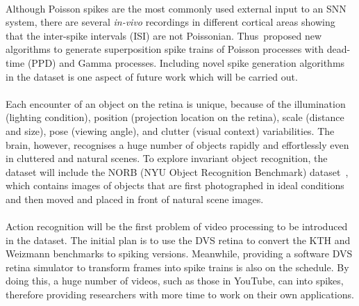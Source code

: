 \DIFdelbegin {}\DIFdelend \DIFaddbegin \paragraph{}
\DIFaddend Although Poisson spikes are the most commonly used external input to an SNN system, there are several \textit{in-vivo} recordings in different cortical areas showing that the inter-spike intervals (ISI) are not Poissonian\DIFdelbegin {}\DIFdelend . 
Thus~\DIFdelbegin {}\DIFdelend \DIFaddbegin {}\DIFaddend proposed new algorithms to generate superposition spike trains of Poisson processes with dead-time (PPD) and \DIFdelbegin {}\DIFdelend Gamma processes.
Including novel spike generation algorithms in the dataset is one aspect of future work which will be carried out.

\DIFaddbegin \paragraph{}
\DIFaddend %
Each encounter of an object on the retina is unique, because of the illumination (lighting condition), position (projection location on the retina), scale (distance and size), pose (viewing angle), and clutter (visual context) variabilities.
The brain, however, recognises a huge number of objects rapidly and effortlessly even in cluttered and natural scenes.
To explore invariant object recognition, the dataset will include the NORB (NYU Object Recognition Benchmark) dataset~\citep{lecun2004learning}, which contains images of objects that are first photographed in ideal conditions and then moved and placed in front of natural scene images.

\DIFaddbegin \paragraph{}
\DIFaddend Action recognition will be the first problem of video processing to be introduced in the dataset.
The initial plan is to use the DVS retina to convert the KTH and Weizmann benchmarks to spiking versions.
Meanwhile, providing a software DVS retina simulator to transform frames into spike trains is also on the schedule.
By doing this, a huge number of videos, such as those in YouTube, can \DIFdelbegin {}\DIFdelend \DIFaddbegin {}\DIFaddend into spikes, therefore providing researchers with more time to work on their own applications.

